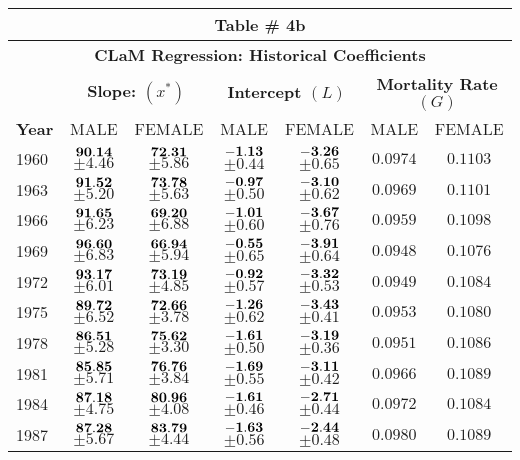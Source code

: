 \documentclass[10pt, titlepage]{article}%
\begin{document}
\begin{table}
  \begin{tabular}{||l|c|c|c|c|c|c||}
  \hline\hline
  \multicolumn{7}{||c||}{Table \# 4b } \\ \hline\hline
  \multicolumn{7}{||c||}{{\bf CLaM Regression: Historical Coefficients}} \\ \hline\hline
  
  { } & 
  \multicolumn{2}{|c|}{ \bf Slope: $(x^{*})$ } & 
  \multicolumn{2}{|c|}{ \bf Intercept $(L)$ }  &
  \multicolumn{2}{|c||}{ \bf Mortality Rate $(G)$ } \\ \hline\hline
  
  {\bf Year } &
  {MALE} & {FEMALE} &
  {MALE} & {FEMALE} &
  {MALE} & {FEMALE} \\ \hline\hline

  1960 &  $\bf 90.14$ $\pm 4.46$& $\bf 72.31$ $\pm 5.86$& $\bf -1.13$ $\pm 0.44$& $\bf -3.26$ $\pm 0.65$&  $0.0974$&  $0.1103$ \\ \hline\hline
  1963 &  $\bf 91.52$ $\pm 5.20$& $\bf 73.78$ $\pm 5.63$& $\bf -0.97$ $\pm 0.50$& $\bf -3.10$ $\pm 0.62$&  $0.0969$&  $0.1101$ \\ \hline\hline
  1966 &  $\bf 91.65$ $\pm 6.23$& $\bf 69.20$ $\pm 6.88$& $\bf -1.01$ $\pm 0.60$& $\bf -3.67$ $\pm 0.76$&  $0.0959$&  $0.1098$ \\ \hline\hline
  1969 &  $\bf 96.60$ $\pm 6.83$& $\bf 66.94$ $\pm 5.94$& $\bf -0.55$ $\pm 0.65$& $\bf -3.91$ $\pm 0.64$&  $0.0948$&  $0.1076$ \\ \hline\hline
  1972 &  $\bf 93.17$ $\pm 6.01$& $\bf 73.19$ $\pm 4.85$& $\bf -0.92$ $\pm 0.57$& $\bf -3.32$ $\pm 0.53$&  $0.0949$&  $0.1084$ \\ \hline\hline
  1975 &  $\bf 89.72$ $\pm 6.52$& $\bf 72.66$ $\pm 3.78$& $\bf -1.26$ $\pm 0.62$& $\bf -3.43$ $\pm 0.41$&  $0.0953$&  $0.1080$ \\ \hline\hline
  1978 &  $\bf 86.51$ $\pm 5.28$& $\bf 75.62$ $\pm 3.30$& $\bf -1.61$ $\pm 0.50$& $\bf -3.19$ $\pm 0.36$&  $0.0951$&  $0.1086$ \\ \hline\hline
  1981 &  $\bf 85.85$ $\pm 5.71$& $\bf 76.76$ $\pm 3.84$& $\bf -1.69$ $\pm 0.55$& $\bf -3.11$ $\pm 0.42$&  $0.0966$&  $0.1089$ \\ \hline\hline
  1984 &  $\bf 87.18$ $\pm 4.75$& $\bf 80.96$ $\pm 4.08$& $\bf -1.61$ $\pm 0.46$& $\bf -2.71$ $\pm 0.44$&  $0.0972$&  $0.1084$ \\ \hline\hline
  1987 &  $\bf 87.28$ $\pm 5.67$& $\bf 83.79$ $\pm 4.44$& $\bf -1.63$ $\pm 0.56$& $\bf -2.44$ $\pm 0.48$&  $0.0980$&  $0.1089$ \\ \hline\hline

\end{tabular}
\end{table}
\end{document}
